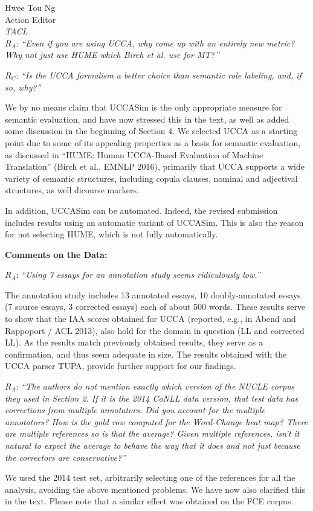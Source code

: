 \documentclass[11pt,letterpaper]{letter}
\begin{document}
\begin{letter}{%
Hwee Tou Ng\\
Action Editor\\
{\em TACL}\\
}
$R_A$: \emph{``Even if you are using UCCA, why come up with an entirely new metric? Why not just use HUME which Birch et al. use for MT?''}


$R_C$: \emph {``Is the UCCA formalism a better choice than semantic role labeling, and, if so, why?''}

We by no means claim that UCCASim is the only appropriate measure for semantic evaluation, and have now stressed this in the text, as well as added some discussion in the beginning of Section 4. We selected UCCA as a starting point due to some of its appealing properties as a basis for semantic evaluation, as discussed in ``HUME: Human UCCA-Based Evaluation of Machine Translation'' (Birch et al., EMNLP 2016), primarily that UCCA supports a wide variety of semantic structures, including copula clauses, nominal and adjectival structures, as well dicourse markers.

In addition, UCCASim can be automated. Indeed, the revised submission includes results using an automatic variant of UCCASim. This is also the reason for not selecting HUME, which is not fully automatically.


\vspace{.5cm}
{\large\bf Comments on the Data:}

$R_A$: \emph{``Using 7 essays for an annotation study seems ridiculously low.''}

The annotation study includes 13 annotated essays, 10 doubly-annotated essays (7 source essays, 3 corrected essays) each of about 500 words. These results serve to show that the IAA scores obtained for UCCA (reported, e.g., in Abend and Rappoport / ACL 2013), also hold for the domain in question (LL and corrected LL). As the results match previously obtained results, they serve as a confirmation, and thus seem adequate in size. The results obtained with the UCCA parser TUPA, provide further support for our findings.

$R_A$: \emph{``The authors do not mention exactly which version of the NUCLE corpus
	they used in Section 2. If it is the 2014 CoNLL data version, that test data
	has corrections from multiple annotators. Did you account for the multiple
	annotators? How is the gold row computed for the Word-Change heat map? There
	are multiple references so is that the average? Given multiple references,
	isn't it natural to expect the average to behave the way that it does and
	not just because the correctors are conservative?''}

We used the 2014 test set, arbitrarily selecting one of the references for all the analysis, avoiding the above mentioned problems. We have now also clarified this in the text. Please note that a similar effect was obtained on the FCE corpus.


\end{letter}
\end{document}
